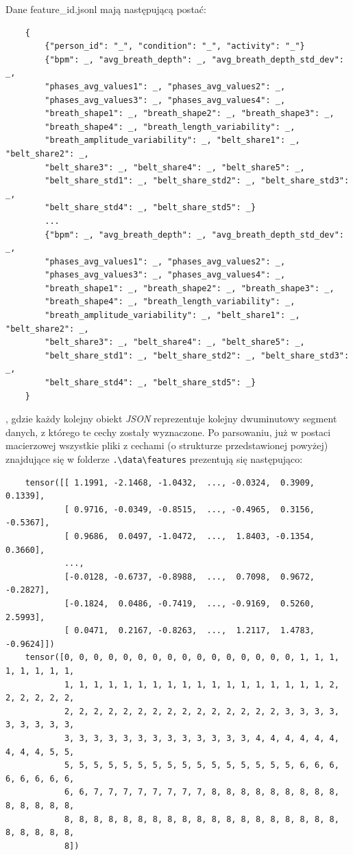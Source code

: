 Dane feature\_id.jsonl mają następującą postać:
\begin{verbatim}
    {
        {"person_id": "_", "condition": "_", "activity": "_"}
        {"bpm": _, "avg_breath_depth": _, "avg_breath_depth_std_dev": _, 
        "phases_avg_values1": _, "phases_avg_values2": _, 
        "phases_avg_values3": _, "phases_avg_values4": _, 
        "breath_shape1": _, "breath_shape2": _, "breath_shape3": _, 
        "breath_shape4": _, "breath_length_variability": _, 
        "breath_amplitude_variability": _, "belt_share1": _, "belt_share2": _, 
        "belt_share3": _, "belt_share4": _, "belt_share5": _,
        "belt_share_std1": _, "belt_share_std2": _, "belt_share_std3": _, 
        "belt_share_std4": _, "belt_share_std5": _}
        ...
        {"bpm": _, "avg_breath_depth": _, "avg_breath_depth_std_dev": _, 
        "phases_avg_values1": _, "phases_avg_values2": _, 
        "phases_avg_values3": _, "phases_avg_values4": _, 
        "breath_shape1": _, "breath_shape2": _, "breath_shape3": _, 
        "breath_shape4": _, "breath_length_variability": _, 
        "breath_amplitude_variability": _, "belt_share1": _, "belt_share2": _, 
        "belt_share3": _, "belt_share4": _, "belt_share5": _,
        "belt_share_std1": _, "belt_share_std2": _, "belt_share_std3": _, 
        "belt_share_std4": _, "belt_share_std5": _}
    }
\end{verbatim},
gdzie każdy kolejny obiekt \textit{JSON} reprezentuje kolejny dwuminutowy segment danych, z którego
te cechy zostały wyznaczone. Po parsowaniu, już w postaci macierzowej wszystkie pliki z cechami
(o strukturze przedstawionej powyżej) znajdujące się w folderze \verb|.\data\features| prezentują
się następująco:
\begin{verbatim}
    tensor([[ 1.1991, -2.1468, -1.0432,  ..., -0.0324,  0.3909,  0.1339],
            [ 0.9716, -0.0349, -0.8515,  ..., -0.4965,  0.3156, -0.5367],
            [ 0.9686,  0.0497, -1.0472,  ...,  1.8403, -0.1354,  0.3660],
            ...,
            [-0.0128, -0.6737, -0.8988,  ...,  0.7098,  0.9672, -0.2827],
            [-0.1824,  0.0486, -0.7419,  ..., -0.9169,  0.5260,  2.5993],
            [ 0.0471,  0.2167, -0.8263,  ...,  1.2117,  1.4783, -0.9624]])
    tensor([0, 0, 0, 0, 0, 0, 0, 0, 0, 0, 0, 0, 0, 0, 0, 0, 1, 1, 1, 1, 1, 1, 1, 1,
            1, 1, 1, 1, 1, 1, 1, 1, 1, 1, 1, 1, 1, 1, 1, 1, 1, 1, 2, 2, 2, 2, 2, 2,
            2, 2, 2, 2, 2, 2, 2, 2, 2, 2, 2, 2, 2, 2, 2, 3, 3, 3, 3, 3, 3, 3, 3, 3,
            3, 3, 3, 3, 3, 3, 3, 3, 3, 3, 3, 3, 3, 4, 4, 4, 4, 4, 4, 4, 4, 4, 5, 5,
            5, 5, 5, 5, 5, 5, 5, 5, 5, 5, 5, 5, 5, 5, 5, 5, 6, 6, 6, 6, 6, 6, 6, 6,
            6, 6, 7, 7, 7, 7, 7, 7, 7, 7, 8, 8, 8, 8, 8, 8, 8, 8, 8, 8, 8, 8, 8, 8,
            8, 8, 8, 8, 8, 8, 8, 8, 8, 8, 8, 8, 8, 8, 8, 8, 8, 8, 8, 8, 8, 8, 8, 8,
            8])
\end{verbatim}

